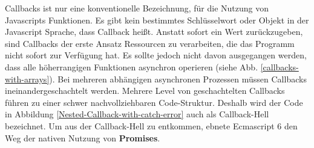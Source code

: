 \noindent
Callbacks ist nur eine konventionelle Bezeichnung, für die Nutzung von Javascripts Funktionen. Es gibt kein bestimmtes Schlüsselwort oder Objekt in der Javascript Sprache, dass Callback heißt. Anstatt sofort ein Wert zurückzugeben, sind Callbacks der erste Ansatz Ressourcen zu verarbeiten, die das Programm nicht sofort zur Verfügung hat. Es sollte jedoch nicht davon ausgegangen werden, dass alle höherrangigen Funktionen asynchron operieren (siehe Abb. \ref{callbacks-with-arrays}). Bei mehreren abhängigen asynchronen Prozessen müssen Callbacks ineinandergeschachtelt werden. Mehrere Level von geschachtelten Callbacks führen zu einer schwer nachvollziehbaren Code-Struktur. Deshalb wird der Code in Abbildung \ref{Nested-Callback-with-catch-error} auch als \glqq{}Callback-Hell\grqq{} bezeichnet. Um aus der Callback-Hell zu entkommen, ebnete Ecmascript 6 den Weg der nativen Nutzung von \textbf{Promises}.



